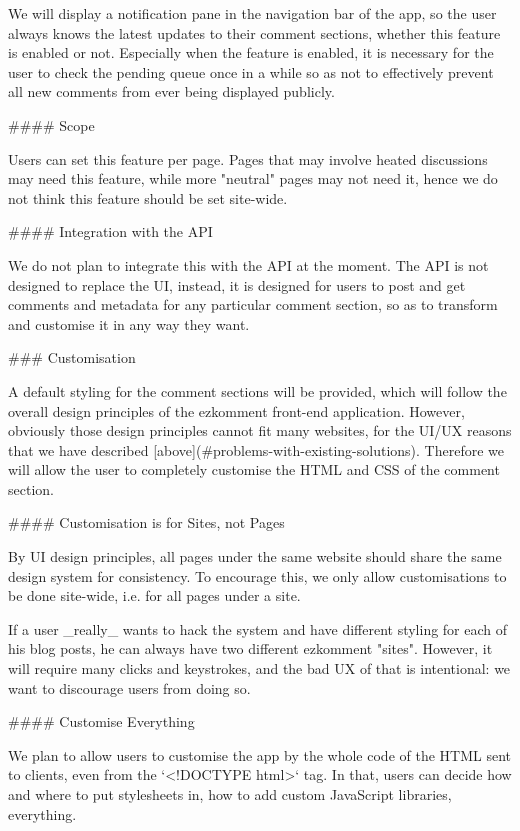 \documentclass[11pt]{article}
\begin{document}
\begin{markdown}
We will display a notification pane in the navigation bar of the app, so the user always knows the latest updates to their comment sections, whether this feature is enabled or not. Especially when the feature is enabled, it is necessary for the user to check the pending queue once in a while so as not to effectively prevent all new comments from ever being displayed publicly.

#### Scope

Users can set this feature per page. Pages that may involve heated discussions may need this feature, while more "neutral" pages may not need it, hence we do not think this feature should be set site-wide.

#### Integration with the API

We do not plan to integrate this with the API at the moment. The API is not designed to replace the UI, instead, it is designed for users to post and get comments and metadata for any particular comment section, so as to transform and customise it in any way they want.

### Customisation

A default styling for the comment sections will be provided, which will follow the overall design principles of the ezkomment front-end application. However, obviously those design principles cannot fit many websites, for the UI/UX reasons that we have described [above](#problems-with-existing-solutions). Therefore we will allow the user to completely customise the HTML and CSS of the comment section.

#### Customisation is for Sites, not Pages

By UI design principles, all pages under the same website should share the same design system for consistency. To encourage this, we only allow customisations to be done site-wide, i.e. for all pages under a site.

If a user _really_ wants to hack the system and have different styling for each of his blog posts, he can always have two different ezkomment "sites". However, it will require many clicks and keystrokes, and the bad UX of that is intentional: we want to discourage users from doing so.

#### Customise Everything

We plan to allow users to customise the app by the whole code of the HTML sent to clients, even from the `<!DOCTYPE html>` tag. In that, users can decide how and where to put stylesheets in, how to add custom JavaScript libraries, everything.


\end{markdown}
\end{document}
